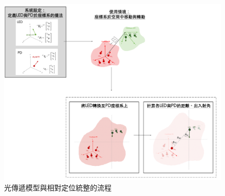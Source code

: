     \begin{figure}[h]
        \centering
        \includegraphics[width=15cm]{ch2pic/model_transform_flow.png}
        \caption{光傳遞模型與相對定位統整的流程}
        \label{pic:model_transform_flow}
    \end{figure}
    
